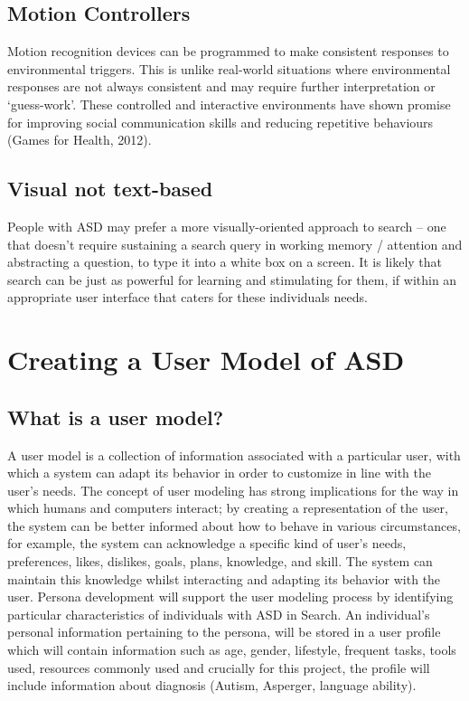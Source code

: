 \documentclass[11pt]{article}
\begin{document}
\subsection{Motion Controllers}
Motion recognition devices can be programmed to make consistent responses to environmental triggers. This is unlike real-world situations where environmental responses are not always consistent and may require further interpretation or ‘guess-work’. These controlled and interactive environments have shown promise for improving social communication skills and reducing repetitive behaviours (Games for Health, 2012).

\subsection{Visual not text-based}
People with ASD may prefer a more visually-oriented approach to search – one that doesn’t require sustaining a search query in working memory / attention and abstracting a question, to type it into a white box on a screen. It is likely that search can be just as powerful for learning and stimulating for them, if within an appropriate user interface that caters for these individuals needs.


\section {Creating a User Model of ASD}
\subsection{What is a user model?}
A user model is a collection of information associated with a particular user, with which a system can adapt its behavior in order to customize in line with the user’s needs. The concept of user modeling has strong implications for the way in which humans and computers interact; by creating a representation of the user, the system can be better informed about how to behave in various circumstances, for example, the system can acknowledge a specific kind of user’s needs, preferences, likes, dislikes, goals, plans, knowledge, and skill. The system can maintain this knowledge whilst interacting and adapting its behavior with the user.
Persona development will support the user modeling process by identifying particular characteristics of individuals with ASD in Search. An individual’s personal information pertaining to the persona, will be stored in a user profile which will contain information such as age, gender, lifestyle, frequent tasks, tools used, resources commonly used and crucially for this project, the profile will include information about diagnosis (Autism, Asperger, language ability).
\end{document}
